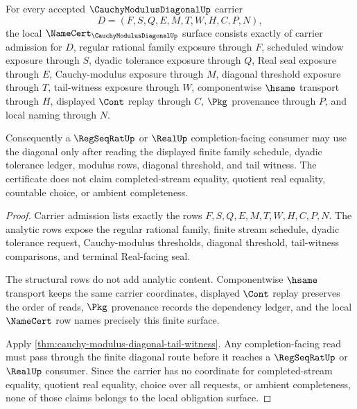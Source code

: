\begin{theorem}
\label{thm:cauchy-modulus-diagonal-namecert-obligations}
For every accepted $\CauchyModulusDiagonalUp$ carrier
$$
D=(F,S,Q,E,M,T,W,H,C,P,N),
$$
the local $\NameCert_{\CauchyModulusDiagonalUp}$ surface consists exactly of carrier admission for $D$, regular rational family exposure through $F$, scheduled window exposure through $S$, dyadic tolerance exposure through $Q$, Real seal exposure through $E$, Cauchy-modulus exposure through $M$, diagonal threshold exposure through $T$, tail-witness exposure through $W$, componentwise $\hsame$ transport through $H$, displayed $\Cont$ replay through $C$, $\Pkg$ provenance through $P$, and local naming through $N$.

Consequently a $\RegSeqRatUp$ or $\RealUp$ completion-facing consumer may use the diagonal only after reading the displayed finite family schedule, dyadic tolerance ledger, modulus rows, diagonal threshold, and tail witness. The certificate does not claim completed-stream equality, quotient real equality, countable choice, or ambient completeness.
\end{theorem}
\begin{proof}
Carrier admission lists exactly the rows $F,S,Q,E,M,T,W,H,C,P,N$. The analytic rows expose the regular rational family, finite stream schedule, dyadic tolerance request, Cauchy-modulus thresholds, diagonal threshold, tail-witness comparisons, and terminal Real-facing seal.

The structural rows do not add analytic content. Componentwise $\hsame$ transport keeps the same carrier coordinates, displayed $\Cont$ replay preserves the order of reads, $\Pkg$ provenance records the dependency ledger, and the local $\NameCert$ row names precisely this finite surface.

Apply \autoref{thm:cauchy-modulus-diagonal-tail-witness}. Any completion-facing read must pass through the finite diagonal route before it reaches a $\RegSeqRatUp$ or $\RealUp$ consumer. Since the carrier has no coordinate for completed-stream equality, quotient real equality, choice over all requests, or ambient completeness, none of those claims belongs to the local obligation surface.
\end{proof}


